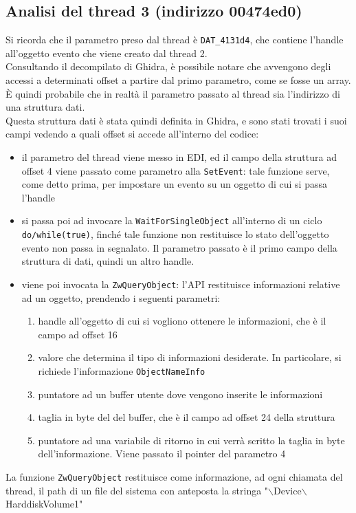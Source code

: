 \documentclass[12pt]{extarticle}
\begin{document}
\subsection{Analisi del thread 3 (indirizzo 00474ed0)}
Si ricorda che il parametro preso dal thread è \texttt{DAT\_4131d4}, che contiene l'handle all'oggetto evento che viene creato dal thread 2.\\Consultando il decompilato di Ghidra, è possibile notare che avvengono degli accessi a determinati offset a partire dal primo parametro, come se fosse un array.\\È quindi probabile che in realtà il parametro passato al thread sia l'indirizzo di una struttura dati.\\Questa struttura dati è stata quindi definita in Ghidra, e sono stati trovati i suoi campi vedendo a quali offset si accede all'interno del codice: 
\begin{itemize}
    \item il parametro del thread viene messo in EDI, ed il campo della struttura ad offset 4 viene passato come parametro alla \texttt{SetEvent}: tale funzione serve, come detto prima, per impostare un evento su un oggetto di cui si passa l'handle 
    \item si passa poi ad invocare la \texttt{WaitForSingleObject} all'interno di un ciclo \texttt{do/while(true)}, finché tale funzione non restituisce lo stato dell'oggetto evento non passa in segnalato. Il parametro passato è il primo campo della struttura di dati, quindi un altro handle.
    \item viene poi invocata la \texttt{ZwQueryObject}: l'API restituisce informazioni relative ad un oggetto, prendendo i seguenti parametri: 
        \begin{enumerate}
            \item handle all'oggetto di cui si vogliono ottenere le informazioni, che è il campo ad offset 16
            \item valore che determina il tipo di informazioni desiderate. In particolare, si richiede l'informazione \texttt{ObjectNameInfo}  
            \item puntatore ad un buffer utente dove vengono inserite le informazioni
            \item taglia in byte del del buffer, che è il campo ad offset 24 della struttura
            \item puntatore ad una variabile di ritorno in cui verrà scritto la taglia in byte dell'informazione. Viene passato il pointer del parametro 4
        \end{enumerate}
\end{itemize}
La funzione \texttt{ZwQueryObject} restituisce come informazione, ad ogni chiamata del thread, il path di un file del sistema con anteposta la stringa "$\backslash$Device$\backslash$HarddiskVolume1"
\end{document}
